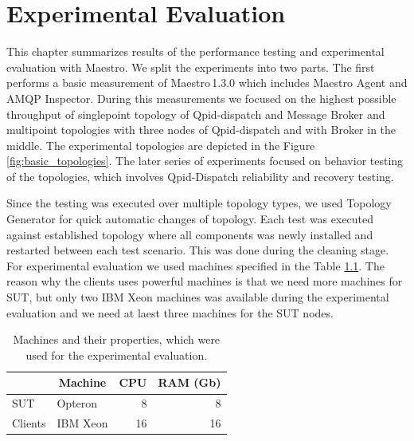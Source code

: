 
\chapter{Experimental Evaluation}
\label{Experimental Evaluation}
This chapter summarizes results of the performance testing and experimental evaluation with Maestro. We split the experiments into two parts. The first performs a basic measurement of Maestro\,1.3.0 which includes Maestro Agent and AMQP Inspector. During this measurements we focused on the highest possible throughput of singlepoint topology of Qpid-dispatch and Message Broker and multipoint topologies with three nodes of Qpid-dispatch and with Broker in the middle. The experimental topologies are depicted in the Figure \ref{fig:basic_topologies}. The later series of experiments focused on behavior testing of the topologies, which involves Qpid-Dispatch reliability and recovery testing.

Since the testing was executed over multiple topology types, we used Topology Generator for quick automatic changes of topology. Each test was executed against established topology where all components was newly installed and restarted between each test scenario. This was done during the cleaning stage. For experimental evaluation we used machines specified in the Table \ref{tab:machines}. The reason why the clients uses powerful machines is that we need more machines for SUT, but only two IBM Xeon machines was available during the experimental evaluation and we need at laest three machines for the SUT nodes.

\begin{table}[]
\centering
\caption{Machines and their properties, which were used for the experimental evaluation.}
\label{tab:machines}
\begin{tabular}{|l|l|r|r|}
\hline
\rowcolor[HTML]{C5E3DF}
\textbf{} & \multicolumn{1}{c|}{\cellcolor[HTML]{C5E3DF}\textbf{Machine}} & \multicolumn{1}{c|}{\cellcolor[HTML]{C5E3DF}\textbf{CPU}} & \multicolumn{1}{c|}{\cellcolor[HTML]{C5E3DF}\textbf{RAM (Gb)}} \\ \hline
SUT       & Opteron                                                       & 8                                                         & 8                                                      \\ \hline
Clients   & IBM Xeon                                                      & 16                                                        & 16                                                     \\ \hline
\end{tabular}
\end{table}

